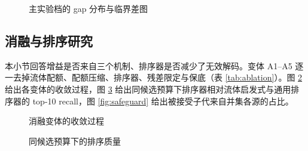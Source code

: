\begin{table}[htbp]
\centering\small
\caption{主要结果：\NumRuns{} 次运行的均值 $\pm$ 标准差；最优加粗；$\dagger$ 表示显著优于次优（Wilcoxon，$p < 0.05$）。S = small 档（相对精确解的 gap），M = main 档（相对参考解的 gap）}\label{tab:main}

\end{table}

\begin{figure}[htbp]
\caption{主实验档的 gap 分布与临界差图}\label{fig:main}
\end{figure}

\subsection{消融与排序研究}\label{sec:ablation}
本小节回答增益是否来自三个机制、排序器是否减少了无效解码。变体 A1--A5 逐一去掉流体配额、配额压缩、排序器、残差限定与保底（表 \ref{tab:ablation}）。图 \ref{fig:ablation} 给出各变体的收敛过程，图 \ref{fig:recall} 给出同候选预算下排序器相对流体启发式与通用排序器的 top-10 recall，图 \ref{fig:safeguard} 给出被接受子代来自并集各源的占比。

\begin{table}[htbp]
\centering\small
\caption{主实验档的消融与机制指标}\label{tab:ablation}

\end{table}

\begin{figure}[htbp]
\caption{消融变体的收敛过程}\label{fig:ablation}
\end{figure}

\begin{figure}[htbp]
\caption{同候选预算下的排序质量}\label{fig:recall}
\end{figure}

